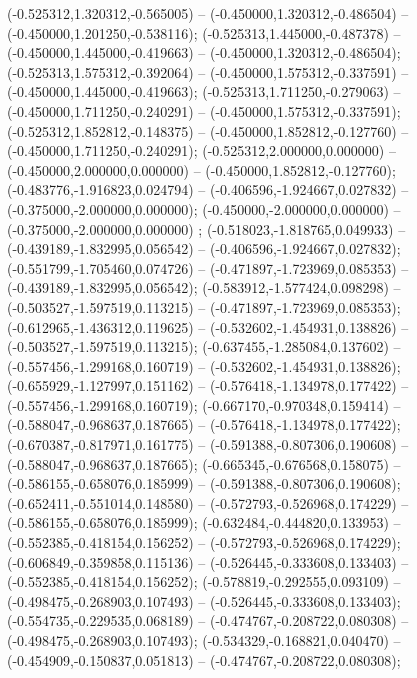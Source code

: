  (-0.525312,1.320312,-0.565005) -- (-0.450000,1.320312,-0.486504) -- (-0.450000,1.201250,-0.538116);
 (-0.525313,1.445000,-0.487378) -- (-0.450000,1.445000,-0.419663) -- (-0.450000,1.320312,-0.486504);
 (-0.525313,1.575312,-0.392064) -- (-0.450000,1.575312,-0.337591) -- (-0.450000,1.445000,-0.419663);
 (-0.525313,1.711250,-0.279063) -- (-0.450000,1.711250,-0.240291) -- (-0.450000,1.575312,-0.337591);
 (-0.525312,1.852812,-0.148375) -- (-0.450000,1.852812,-0.127760) -- (-0.450000,1.711250,-0.240291);
 (-0.525312,2.000000,0.000000) -- (-0.450000,2.000000,0.000000) -- (-0.450000,1.852812,-0.127760);
 (-0.483776,-1.916823,0.024794) -- (-0.406596,-1.924667,0.027832) -- (-0.375000,-2.000000,0.000000);
 (-0.450000,-2.000000,0.000000) -- (-0.375000,-2.000000,0.000000) ;
 (-0.518023,-1.818765,0.049933) -- (-0.439189,-1.832995,0.056542) -- (-0.406596,-1.924667,0.027832);
 (-0.551799,-1.705460,0.074726) -- (-0.471897,-1.723969,0.085353) -- (-0.439189,-1.832995,0.056542);
 (-0.583912,-1.577424,0.098298) -- (-0.503527,-1.597519,0.113215) -- (-0.471897,-1.723969,0.085353);
 (-0.612965,-1.436312,0.119625) -- (-0.532602,-1.454931,0.138826) -- (-0.503527,-1.597519,0.113215);
 (-0.637455,-1.285084,0.137602) -- (-0.557456,-1.299168,0.160719) -- (-0.532602,-1.454931,0.138826);
 (-0.655929,-1.127997,0.151162) -- (-0.576418,-1.134978,0.177422) -- (-0.557456,-1.299168,0.160719);
 (-0.667170,-0.970348,0.159414) -- (-0.588047,-0.968637,0.187665) -- (-0.576418,-1.134978,0.177422);
 (-0.670387,-0.817971,0.161775) -- (-0.591388,-0.807306,0.190608) -- (-0.588047,-0.968637,0.187665);
 (-0.665345,-0.676568,0.158075) -- (-0.586155,-0.658076,0.185999) -- (-0.591388,-0.807306,0.190608);
 (-0.652411,-0.551014,0.148580) -- (-0.572793,-0.526968,0.174229) -- (-0.586155,-0.658076,0.185999);
 (-0.632484,-0.444820,0.133953) -- (-0.552385,-0.418154,0.156252) -- (-0.572793,-0.526968,0.174229);
 (-0.606849,-0.359858,0.115136) -- (-0.526445,-0.333608,0.133403) -- (-0.552385,-0.418154,0.156252);
 (-0.578819,-0.292555,0.093109) -- (-0.498475,-0.268903,0.107493) -- (-0.526445,-0.333608,0.133403);
 (-0.554735,-0.229535,0.068189) -- (-0.474767,-0.208722,0.080308) -- (-0.498475,-0.268903,0.107493);
 (-0.534329,-0.168821,0.040470) -- (-0.454909,-0.150837,0.051813) -- (-0.474767,-0.208722,0.080308);
